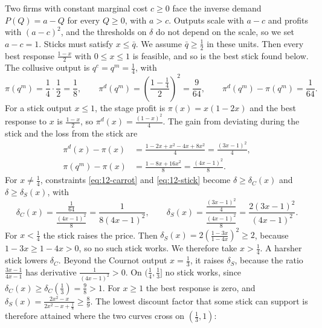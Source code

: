 \begin{example}\label{ex:12-abreu-linear}
Two firms with constant marginal cost $c \ge 0$ face the inverse demand $P(Q) = a - Q$ for every $Q \ge 0$, with
$a > c$. Outputs scale with $a - c$ and profits with $(a - c)^2$, and the thresholds on $\delta$ do not depend on the
scale, so we set $a - c = 1$. Sticks must satisfy $x \le \bar q$. We assume $\bar q \ge \frac{1}{2}$ in these units.
Then every best response $\frac{1 - x}{2}$ with $0 \le x \le 1$ is feasible, and so is the best stick found below. The collusive output is
$q^c = q^m = \frac{1}{4}$, with
\begin{equation*}
\pi(q^m) = \frac{1}{4}\cdot\frac{1}{2} = \frac{1}{8}, \qquad
\pi^d(q^m) = \left(\frac{1 - \frac{1}{4}}{2}\right)^2 = \frac{9}{64}, \qquad
\pi^d(q^m) - \pi(q^m) = \frac{1}{64} .
\end{equation*}
For a stick output $x \le 1$, the stage profit is $\pi(x) = x(1 - 2x)$ and the best response to $x$ is
$\frac{1 - x}{2}$, so $\pi^d(x) = \frac{(1 - x)^2}{4}$. The gain from deviating during the stick and the loss from the
stick are
\begin{align*}
\pi^d(x) - \pi(x) &= \frac{1 - 2x + x^2 - 4x + 8x^2}{4} = \frac{(3x - 1)^2}{4} , \\
\pi(q^m) - \pi(x) &= \frac{1 - 8x + 16x^2}{8} = \frac{(4x - 1)^2}{8} .
\end{align*}
For $x \ne \frac{1}{4}$, constraints \eqref{eq:12-carrot} and \eqref{eq:12-stick} become $\delta \ge \delta_C(x)$ and
$\delta \ge \delta_S(x)$, with
\begin{equation*}
\delta_C(x) = \frac{\frac{1}{64}}{\frac{(4x - 1)^2}{8}} = \frac{1}{8(4x - 1)^2} , \qquad
\delta_S(x) = \frac{\frac{(3x - 1)^2}{4}}{\frac{(4x - 1)^2}{8}} = \frac{2(3x - 1)^2}{(4x - 1)^2} .
\end{equation*}
For $x < \frac{1}{4}$ the stick raises the price. Then
$\delta_S(x) = 2\left(\frac{1 - 3x}{1 - 4x}\right)^2 \ge 2$, because $1 - 3x \ge 1 - 4x > 0$, so no such stick
works. We therefore take $x > \frac{1}{4}$. A harsher stick lowers $\delta_C$. Beyond the Cournot output $x = \frac{1}{3}$, it raises $\delta_S$, because the
ratio $\frac{3x - 1}{4x - 1}$ has derivative $\frac{1}{(4x - 1)^2} > 0$. On $(\frac{1}{4}, \frac{1}{3}]$ no stick
works, since $\delta_C(x) \ge \delta_C(\frac{1}{3}) = \frac{9}{8} > 1$. For $x \ge 1$ the best response is zero, and
$\delta_S(x) = \frac{2x^2 - x}{2x^2 - x + \frac{1}{8}} \ge \frac{8}{9}$. The lowest discount factor that some stick
can support is therefore attained where the two curves cross on $(\frac{1}{3}, 1)$:

\end{example}
